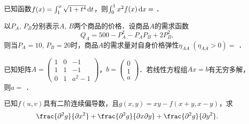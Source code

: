 \documentclass[plain,noanswer,medmath]{../../template/jnuexam}
\begin{document}
\begin{problem}
已知函数$f(x) = \int_1^x \sqrt{1 + t^4} \mathop{}\!\mathrm{d} t$，则$\int_0^1 x^2 f(x)\mathop{}\!\mathrm{d} x =$ \fillin{}．
\end{problem}


\begin{problem}
以$P_A$, $P_B$分别表示$A$, $B$两个商品的价格．设商品$A$的需求函数
$$Q_A = 500 - P_A^2 - P_A P_B + 2P_B^2,$$
则当$P_A=10$, $P_B=20$时，商品$A$的需求量对自身价格弹性$\eta_{AA}\;(\eta_{AA} > 0)=$ \fillin{}．
\end{problem}


\begin{problem}
已知矩阵$A = \begin{pmatrix}
  1 & 0 & -1 \\
  1 & 1 & -1 \\
  0 & 1 & a^2 - 1
\end{pmatrix}$，$b = \begin{pmatrix}
  0 \\
  1 \\
  a
\end{pmatrix}$．若线性方程组$Ax = b$有无穷多解，则$a =$ \fillin{}．
\end{problem}








\begin{problem}[points=10]
已知$f(u,v)$具有二阶连续偏导数，且$g(x,y) = xy - f(x + y,x - y)$，求
$$\frac{\pd^2 g}{\pd x^2} + \frac{\pd^2 g}{\pdx\pd y} + \frac{\pd^2 g}{\pd y^2}.$$
\end{problem}














\end{document}
